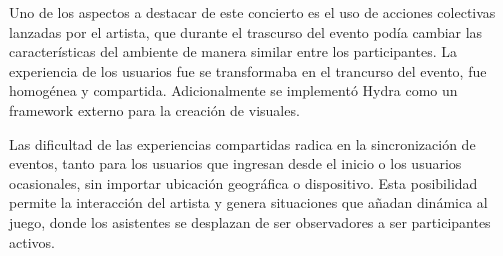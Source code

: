 Uno de los aspectos a destacar de este concierto es el uso de acciones colectivas lanzadas por el artista, que durante el trascurso del evento podía cambiar las características del ambiente de manera similar entre los participantes. La experiencia de los usuarios fue se transformaba en el trancurso del evento, fue homogénea y compartida. Adicionalmente se implementó Hydra \citep{hydra} como un framework externo para la creación de visuales.

Las dificultad de las experiencias compartidas radica en la sincronización de eventos, tanto para los usuarios que ingresan desde el inicio o los usuarios ocasionales, sin importar ubicación geográfica o dispositivo. Esta posibilidad permite la interacción del artista y genera situaciones que añadan dinámica al juego, donde los asistentes se desplazan de ser observadores a ser participantes activos.

